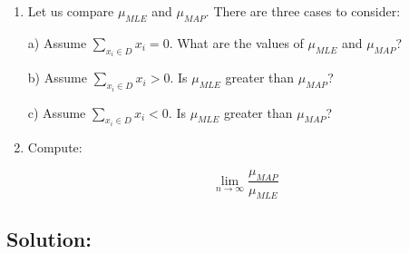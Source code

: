 \documentclass[submit]{harvardml}
\begin{document}
\begin{problem}
\begin{enumerate}
\item Let us compare $\mu_{MLE}$  and $\mu_{MAP}$. There are three cases to consider:

 a) Assume $\sum_{x_i \in D} x_i=0$. What are the values of $\mu_{MLE}$ and $\mu_{MAP}$?

 b) Assume $\sum_{x_i \in D} x_i>0$. Is $\mu_{MLE}$ greater than $\mu_{MAP}$?

 c) Assume $\sum_{x_i \in D} x_i<0$. Is $\mu_{MLE}$ greater than $\mu_{MAP}$?
  
    
\item Compute:

$$\lim_{n \rightarrow \infty} \frac{\mu_{MAP}}{\mu_{MLE}}$$

  \end{enumerate}

  \end{problem}

\newpage
\subsection*{Solution:}
\end{document}
